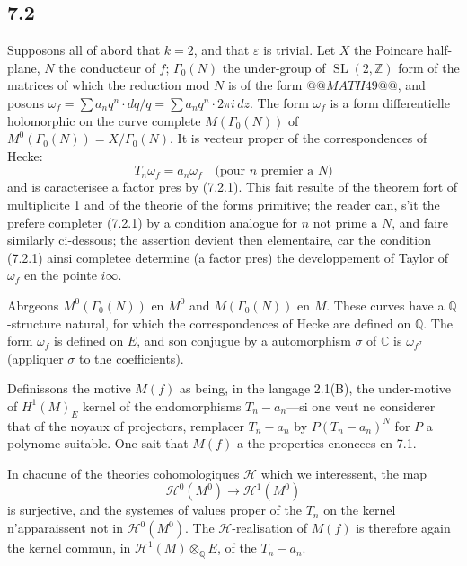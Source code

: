 \documentclass[12pt,a4paper]{article}
\theoremstyle{plain}
\theoremstyle{definition}
\theoremstyle{remark}
\DeclareMathOperator{\SL}{SL}
\newcommand{\Q}{\mathbb{Q}}
\newcommand{\C}{\mathbb{C}}
\newcommand{\Z}{\mathbb{Z}}
\begin{document}
\subsection*{7.2}

Supposons all of abord that $k = 2$, and that $\varepsilon$ is trivial. Let $X$ the Poincare half-plane, $N$ the conducteur of $f$; $\Gamma_0(N)$ the under-group of $\SL(2, \Z)$ form
of the matrices of which the reduction mod $N$ is of the form $@@MATH49@@$,
and posons $\omega_f = \sum a_n q^n \cdot dq/q = \sum a_n q^n \cdot 2\pi i \, dz$. The form
$\omega_f$ is a form differentielle holomorphic on the curve complete $M(\Gamma_0(N))$ of
$M^0(\Gamma_0(N)) = X/\Gamma_0(N)$. It is vecteur proper of the correspondences of Hecke:
\begin{equation}\label{eq:7.2.1}
T_n \omega_f = a_n \omega_f \quad \text{(pour $n$ premier a $N$)}
\end{equation}
and is caracterisee a factor pres by (7.2.1). This fait resulte of the theorem fort of
multiplicite 1 and of the theorie of the forms primitive; the reader can, s'it the prefere
completer (7.2.1) by a condition analogue for $n$ not prime a $N$, and faire similarly ci-dessous; the assertion devient then elementaire, car the condition (7.2.1)
ainsi completee determine (a factor pres) the developpement of Taylor of $\omega_f$
en the pointe $i\infty$.

Abrgeons $M^0(\Gamma_0(N))$ en $M^0$ and $M(\Gamma_0(N))$ en $M$. These curves have a
$\Q$-structure natural, for which the correspondences of Hecke are defined on
$\Q$. The form $\omega_f$ is defined on $E$, and son conjugue by a automorphism
$\sigma$ of $\C$ is $\omega_{f^\sigma}$ (appliquer $\sigma$ to the coefficients).

Definissons the motive $M(f)$ as being, in the langage 2.1(B), the under-motive of
$H^1(M)_E$ kernel of the endomorphisms $T_n - a_n$---si one veut ne considerer that of the
noyaux of projectors, remplacer $T_n - a_n$ by $P(T_n - a_n)^N$ for $P$ a polynome
suitable. One sait that $M(f)$ a the properties enoncees en 7.1.

In chacune of the theories cohomologiques $\mathcal{H}$ which we interessent, the map
\begin{equation}\label{eq:7.2.2}
\mathcal{H}^0(M^0) \to \mathcal{H}^1(M^0)
\end{equation}
is surjective, and the systemes of values proper of the $T_n$ on the kernel n'apparaissent
not in $\mathcal{H}^0(M^0)$. The $\mathcal{H}$-realisation of $M(f)$ is therefore again the kernel commun,
in $\mathcal{H}^1(M) \otimes_\Q E$, of the $T_n - a_n$.
\end{document}
